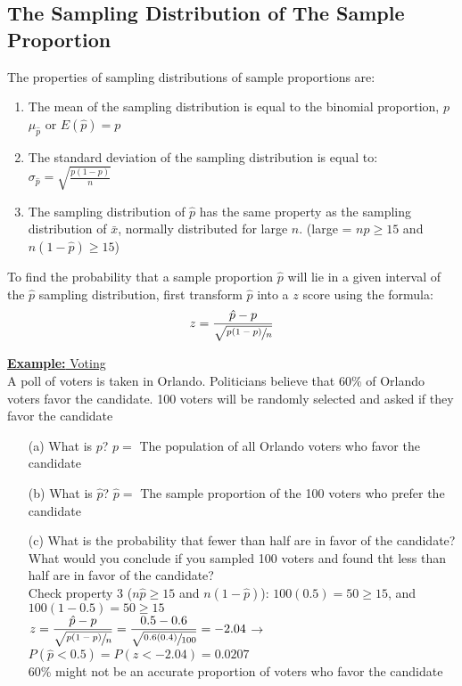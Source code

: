 \documentclass[a4paper]{article}
\let\bf\textbf
\begin{document}
\subsection{The Sampling Distribution of The Sample Proportion}
The properties of sampling distributions of sample proportions are:
\begin{enumerate}
    \item The mean of the sampling distribution is equal to the binomial proportion, $p$\\
    $\mu_{\hat{p}}$ or $E(\hat{p}) = p$
    \item The standard deviation of the sampling distribution is equal to:\\
    $\displaystyle \sigma_{\hat{p}} = \sqrt{\frac{p(1 - p)}{n}}$
    \item The sampling distribution of $\hat{p}$ has the same property as the sampling distribution of $\bar{x}$, normally distributed for large $n$. (large = $n\hat{p} \geq 15$ and $n(1 - \hat{p}) \geq 15$)
\end{enumerate}
To find the probability that a sample proportion $\hat{p}$ will lie in a given interval of the $\hat{p}$ sampling distribution, first transform $\hat{p}$ into a $z$ score using the formula:
\begin{equation}
    z = \frac{\hat{p} - p}{\sqrt{\sfrac{p(1 - p)}{n}}}
\end{equation}

\begin{shaded}
    \underline{\bf{Example:} Voting}
    \vspace{2mm}\\
    A poll of voters is taken in Orlando. Politicians believe that 60\% of Orlando voters favor the candidate. 100 voters will be randomly selected and asked if they favor the candidate
    \begin{enumerate}
        \item[(a)] What is $p$? $p = $ The population of all Orlando voters who favor the candidate
        \item[(b)] What is $\hat{p}$? $\hat{p} =$ The sample proportion of the 100 voters who prefer the candidate
        \item[(c)] What is the probability that fewer than half are in favor of the candidate? What would you conclude if you sampled 100 voters and found tht less than half are in favor of the candidate?\vspace{1mm}\\
        Check property 3 ($n\hat{p} \geq 15$ and $n(1 - \hat{p})$): $100(0.5) = 50 \geq 15$, and $100(1 - 0.5) = 50 \geq 15$\\
        $\displaystyle z = \frac{\hat{p} - p}{\sqrt{\sfrac{p(1 - p)}{n}}} = \frac{0.5 - 0.6}{\sqrt{\sfrac{0.6(0.4)}{100}}} = -2.04$\hspace{2mm}$\to$\hspace{2mm} $P(\hat{p} < 0.5) = P(z < -2.04) = 0.0207$\vspace{1mm}\\
        60\% might not be an accurate proportion of voters who favor the candidate
    \end{enumerate}
\end{shaded}
\end{document}
